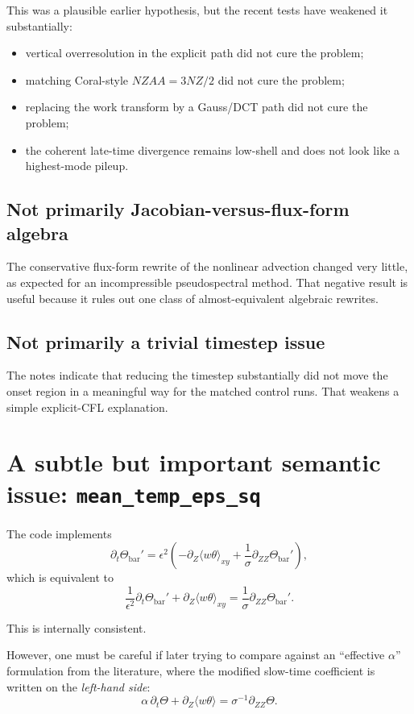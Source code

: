 \documentclass[11pt]{article}
\begin{document}
This was a plausible earlier hypothesis, but the recent tests have weakened it substantially:

\begin{itemize}
\item vertical overresolution in the explicit path did not cure the problem;
\item matching Coral-style $NZAA=3NZ/2$ did not cure the problem;
\item replacing the work transform by a Gauss/DCT path did not cure the problem;
\item the coherent late-time divergence remains low-shell and does not look like a highest-mode pileup.
\end{itemize}

\subsection{Not primarily Jacobian-versus-flux-form algebra}

The conservative flux-form rewrite of the nonlinear advection changed very little, as expected for an incompressible pseudospectral method. That negative result is useful because it rules out one class of almost-equivalent algebraic rewrites.

\subsection{Not primarily a trivial timestep issue}

The notes indicate that reducing the timestep substantially did not move the onset region in a meaningful way for the matched control runs. That weakens a simple explicit-CFL explanation.

\section{A subtle but important semantic issue: \texttt{mean\_temp\_eps\_sq}}

The code implements
\[
\partial_t \Theta_{\mathrm{bar}}'
=
\epsilon^2 \left(
-\partial_Z\langle w\theta\rangle_{xy}
+
\frac{1}{\sigma}\partial_{ZZ}\Theta_{\mathrm{bar}}'
\right),
\]
which is equivalent to
\[
\frac{1}{\epsilon^2}\partial_t \Theta_{\mathrm{bar}}'
+
\partial_Z\langle w\theta\rangle_{xy}
=
\frac{1}{\sigma}\partial_{ZZ}\Theta_{\mathrm{bar}}'.
\]

This is internally consistent.

However, one must be careful if later trying to compare against an ``effective $\alpha$'' formulation from the literature, where the modified slow-time coefficient is written on the \emph{left-hand side}:
\[
\alpha\,\partial_t \Theta + \partial_Z \langle w\theta\rangle = \sigma^{-1}\partial_{ZZ}\Theta.
\]
\end{document}
